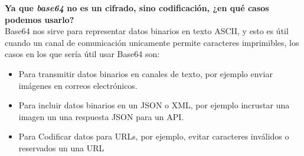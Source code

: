 \textbf{Ya que \textit{base64} no es un cifrado, sino codificación, ¿en qué casos podemos usarlo?}\\

Base64 nos sirve para representar datos binarios en texto ASCII, y esto es útil cuando un canal de comunicación unicamente permite caracteres imprimibles, los casos en los que sería útil usar Base64 son:
\begin{itemize}
    \item{Para transmitir datos binarios en canales de texto, por ejemplo enviar imágenes en correos electrónicos.}
    \item{Para incluir datos binarios en un JSON o XML, por ejemplo incrustar una imagen un una respuesta JSON para un API.}
    \item{Para Codificar datos para URLs, por ejemplo, evitar caracteres inválidos o reservados un una URL}
\end{itemize}